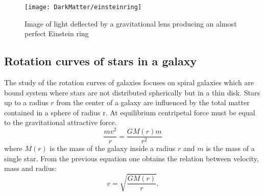 \begin{figure}[tp]
\centering
\texttt{[image: DarkMatter/einsteinring]}
\caption{Image of light deflected by a gravitational lens producing an almost perfect Einstein ring}
\label{fig:einsteinring}
\end{figure}



   
\subsection{Rotation curves of stars in a galaxy}
\label{sec:rotcurves}
The study of the rotation curves of galaxies focuses on spiral galaxies which are bound system where stars are not distributed spherically but in a thin disk. Stars up to a radius $r$ from the center of a galaxy are influenced by the total matter contained in a sphere of radius r. At equilibrium centripetal force must be equal to the gravitational attractive force.
\begin{equation}
\frac{mv^2}{r}=\frac{GM(r)m}{r^2}
\label{previous}
\end{equation}
where $M(r)$ is the mass of the galaxy inside a radius $r$ and $m$ is the mass of a single star. From the previous equation one obtains the relation between velocity, mass and radius:
\begin{equation}
v=\sqrt{\frac{GM(r)}{r}}.
\end{equation}

